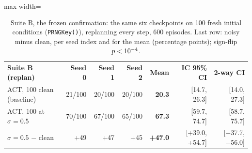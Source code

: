 \begin{table}[t]
\centering
\scriptsize
\begin{adjustbox}{max width=\linewidth}
\begin{tabular}{lrrrrrr}
\toprule
Suite B (replan) & Seed 0 & Seed 1 & Seed 2 & Mean & IC 95\% CI & 2-way CI \\
\midrule
ACT, 100 clean (baseline) & 21/100 & 20/100 & 20/100 & \textbf{20.3} & [14.7, 26.3] & [14.0, 27.3] \\
ACT, 100 at $\sigma{=}0.5$ & 70/100 & 67/100 & 65/100 & \textbf{67.3} & [59.7, 74.7] & [58.7, 75.7] \\
\midrule
$\sigma{=}0.5$ $-$ clean & +49 & +47 & +45 & \textbf{+47.0} & [+39.0, +54.7] & [+37.7, +56.0] \\
\bottomrule
\end{tabular}
\end{adjustbox}
\caption{Suite B, the frozen confirmation: the same six checkpoints on 100 fresh initial conditions (\texttt{PRNGKey(\freshBase)}), replanning every step, 600 episodes. Last row: noisy minus clean, per seed index and for the mean (percentage points); sign-flip $p<10^{-4}$.}
\label{tab:fresh}
\end{table}
